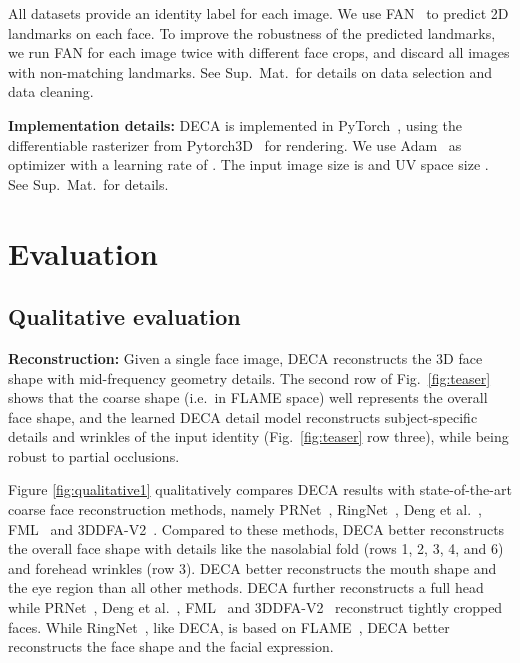 \documentclass[final]{cvpr}
\newcommand{\qheading}[1]{\noindent\textbf{#1}}
\newcommand{\modelname}{DECA\xspace}
\newcommand{\supmat}{Sup.~Mat.\xspace}
\begin{document}
All datasets provide an identity label for each image.
We use FAN~\cite{Bulat2017} to predict  2D landmarks  on each face. 
To improve the robustness of the predicted landmarks, we run FAN for each image twice with different face crops, and discard all images with non-matching landmarks.
See \supmat~for details on data selection and data cleaning.

\qheading{Implementation details:}
\modelname is implemented in PyTorch~\cite{Paszke2019PyTorchAI}, using the differentiable rasterizer from Pytorch3D~\cite{ravi2020pytorch3d} for rendering.
We use Adam~\cite{Kingma2015AdamAM} as optimizer with a learning rate of .  
The input image size is  and UV space size . 
See \supmat~for details.
 \section{Evaluation}

\subsection{Qualitative evaluation}
\label{sec:qual_eval}

\qheading{Reconstruction:}
Given a single face image, \modelname reconstructs the 3D face shape with mid-frequency geometry details.
The second row of Fig.~\ref{fig:teaser} shows that the coarse shape (i.e.~in FLAME space) well represents the overall face shape, and the learned \modelname detail model reconstructs subject-specific details and wrinkles of the input identity (Fig.~\ref{fig:teaser} row three), while being robust to partial occlusions.

Figure \ref{fig:qualitative1} qualitatively compares \modelname results with state-of-the-art coarse face reconstruction methods, namely PRNet~\cite{Feng2018}, RingNet~\cite{Sanyal2019}, Deng et al.~\cite{Deng2019}, FML~\cite{Tewari2019} and 3DDFA-V2~\cite{guo2020towards}.
Compared to these methods, \modelname better reconstructs the overall face shape with details like the nasolabial fold (rows 1, 2, 3, 4, and 6) and forehead wrinkles (row 3).
\modelname better reconstructs the mouth shape and the eye region than all other methods.
\modelname further reconstructs a full head while PRNet~\cite{Feng2018}, Deng et al.~\cite{Deng2019}, FML~\cite{Tewari2019} and 3DDFA-V2~\cite{guo2020towards} reconstruct tightly cropped faces. 
While RingNet~\cite{Sanyal2019}, like \modelname, is based on FLAME~\cite{FLAME2017}, \modelname better reconstructs the face shape and the facial expression. 
\end{document}
